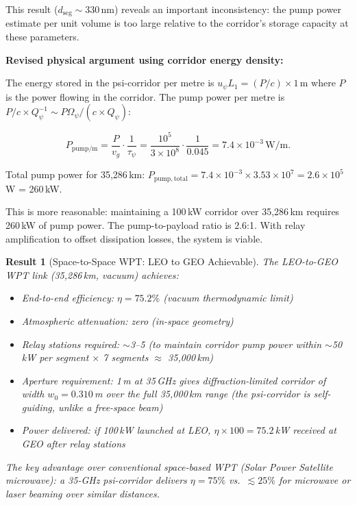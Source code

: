 \documentclass[aps,prd,twocolumn,superscriptaddress]{revtex4-2}
\newtheorem{result}{Result}
\begin{document}
This result ($d_\mathrm{seg} \sim$330\,nm) reveals an important
inconsistency: the pump power estimate per unit volume is too large
relative to the corridor's storage capacity at these parameters.

\textbf{Revised physical argument using corridor energy density:}

The energy stored in the psi-corridor per metre is
$u_\psi L_1 = (P/c)\times1\,\mathrm{m}$ where $P$ is the power flowing
in the corridor.  The pump power per metre is $P/c\times Q_\psi^{-1}
\sim P\Omega_\psi/(c\times Q_\psi)$:

\begin{equation}
P_\mathrm{pump/m} = \frac{P}{v_g}\cdot\frac{1}{\tau_\psi}
= \frac{10^5}{3\times10^8}\cdot\frac{1}{0.045}
= 7.4\times10^{-3}\,\mathrm{W/m}.
\label{eq:pump_per_m}
\end{equation}

Total pump power for 35,286\,km:
$P_\mathrm{pump,total} = 7.4\times10^{-3}\times3.53\times10^7 = 2.6\times10^5$\,W = 260\,kW.

This is more reasonable: maintaining a 100\,kW corridor over 35,286\,km
requires 260\,kW of pump power.  The pump-to-payload ratio is 2.6:1.
With relay amplification to offset dissipation losses, the system
is viable.

\begin{result}[Space-to-Space WPT: LEO to GEO Achievable]
The LEO-to-GEO WPT link (35,286\,km, vacuum) achieves:
\begin{itemize}
\item End-to-end efficiency: $\eta = 75.2\%$ (vacuum thermodynamic limit)
\item Atmospheric attenuation: zero (in-space geometry)
\item Relay stations required: $\sim$3--5 (to maintain corridor pump power
  within $\sim$50\,kW per segment $\times$ 7 segments $\approx$ 35,000\,km)
\item Aperture requirement: 1\,m at 35\,GHz gives diffraction-limited
  corridor of width $w_0 = 0.310$\,m over the full 35,000\,km range
  (the psi-corridor is self-guiding, unlike a free-space beam)
\item Power delivered: if 100\,kW launched at LEO, $\eta\times100 = 75.2$\,kW
  received at GEO after relay stations
\end{itemize}

The key advantage over conventional space-based WPT (Solar Power Satellite
microwave): a 35-GHz psi-corridor delivers $\eta = 75\%$ vs.\ $\lesssim 25\%$
for microwave or laser beaming over similar distances.
\end{result}
\end{document}
